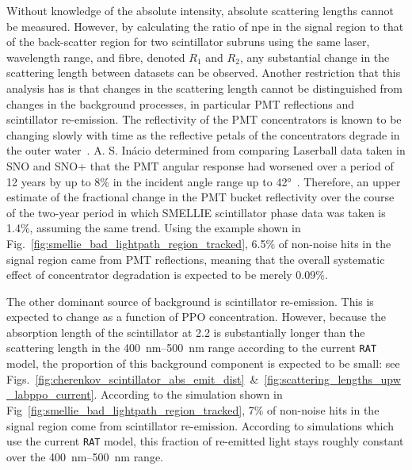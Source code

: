 Without knowledge of the absolute intensity, absolute scattering lengths cannot be measured. However, by calculating the ratio of npe in the signal region to that of the back-scatter region for two scintillator subruns using the same laser, wavelength range, and fibre, denoted $R_{1}$ and $R_{2}$, any substantial change in the scattering length between datasets can be observed. Another restriction that this analysis has is that changes in the scattering length cannot be distinguished from changes in the background processes, in particular PMT reflections and scintillator re-emission. The reflectivity of the PMT concentrators is known to be changing slowly with time as the reflective petals of the concentrators degrade in the outer water~\cite{andersonOpticalCalibrationSNO2021}. %
A. S. In\'{a}cio determined from comparing Laserball data taken in SNO and SNO+ that the PMT angular response had worsened over a period of 12 years by up to 8\% in the incident angle range up to \ang{42}~\cite{inacioDataAnalysisWater2022}. Therefore, an upper estimate of the fractional change in the PMT bucket reflectivity over the course of the two-year period in which SMELLIE scintillator phase data was taken is 1.4\%, assuming the same trend. Using the example shown in Fig.~\ref{fig:smellie_bad_lightpath_region_tracked}, 6.5\% of non-noise hits in the signal region came from PMT reflections, meaning that the overall systematic effect of concentrator degradation is expected to be merely 0.09\%.
 
The other dominant source of background is scintillator re-emission. This is expected to change as a function of PPO concentration. However, because the absorption length of the scintillator at \SI{2.2}{\gpl} is substantially longer than the scattering length in the \SIrange{400}{500}{\nm} range according to the current \texttt{RAT} model, the proportion of this background component is expected to be small: see Figs.~\ref{fig:cherenkov_scintillator_abs_emit_dist}~\&~\ref{fig:scattering_lengths_upw_labppo_current}. According to the simulation shown in Fig~\ref{fig:smellie_bad_lightpath_region_tracked}, 7\% of non-noise hits in the signal region come from scintillator re-emission. According to simulations which use the current \texttt{RAT} model, this fraction of re-emitted light stays roughly constant over the \SIrange{400}{500}{\nm} range.

